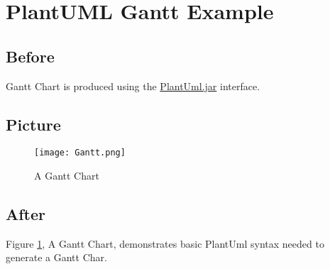 \documentclass{article}%
\begin{document}
%
\section{PlantUML Gantt Example}%

  \subsection{Before}%
  Gantt Chart is produced using the
  \href{https://plantuml.com}{PlantUml.jar} interface.

  \subsection{Picture}%

  \begin{figure}[h]%
    \centering%
    \texttt{[image: Gantt.png]}%
    \caption{A Gantt Chart}%
    \label{fig:ganttchart}%
  \end{figure}%

  \subsection{After}%
  Figure \ref{fig:ganttchart}, A Gantt Chart,  demonstrates basic PlantUml
  syntax needed to generate a Gantt Char.
\end{document}
